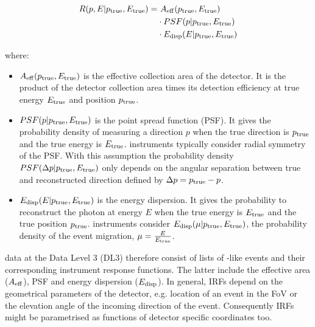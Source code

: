 \documentclass[longauth]{aa}
\begin{document}
\begin{equation}
	\begin{split}
   R(p, E|p_{\rm true}, E_{\rm true}) = &~A_{\rm eff}(p_{\rm true}, E_{\rm true}) \\
	& \cdot PSF(p|p_{\rm true}, E_{\rm true})\\
    & \cdot E_{\rm disp}(E|p_{\rm true}, E_{\rm true})
	\end{split}
\end{equation}

where:
\begin{itemize}
\setlength\itemsep{1em}
\item $A_{\rm eff}(p_{\rm true}, E_{\rm true})$ is the effective collection area of the detector. It is the product
  of the detector collection area times its detection efficiency at true energy $E_{\rm true}$ and position $p_{\rm true}$.
\item $PSF(p|p_{\rm true}, E_{\rm true})$ is the point spread function (PSF). It gives the probability density of
  measuring a direction $p$ when the true direction is $p_{\rm true}$ and the true energy is $E_{\rm true}$.
  \gammaray instruments typically consider radial symmetry of the PSF. With this assumption the probability density 
  $PSF(\Delta p|p_{\rm true}, E_{\rm true})$ only depends on the angular separation between true
 and reconstructed direction defined by $\Delta p = p_{\rm true} - p$.  
\item $E_{\rm disp}(E|p_{\rm true}, E_{\rm true})$ is the energy dispersion. It gives the probability to
  reconstruct the photon at energy $E$ when the true energy is $E_{\rm true}$ and the true position $p_{\rm true}$.
  \gammaray instruments consider $E_{\rm disp}(\mu|p_{\rm true}, E_{\rm true})$, the probability density of the event migration, $\mu=\frac{E}{E_{\rm true}}$.
\end{itemize}

\gammaray data at the Data Level 3 (DL3) therefore consist of lists of \gammaray-like events and their
corresponding instrument response functions. The latter include the effective area ($A_{\rm eff}$),
PSF and energy dispersion ($E_{\rm disp}$).
In general, IRFs depend on the geometrical parameters of the detector, e.g. location 
of an event in the FoV or the elevation angle of the incoming direction of the event.
Consequently IRFs might be parametrised as functions of detector specific coordinates too.
\end{document}
